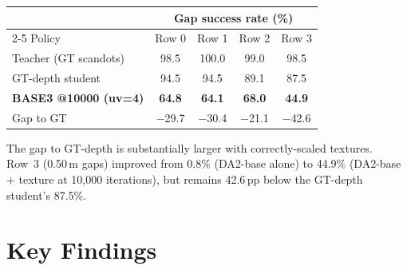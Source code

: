 \documentclass[11pt,a4paper]{article}
\newcommand{\best}[1]{\textcolor{best}{\textbf{#1}}}
\begin{document}
\begin{center}
\begin{tabular}{l cccc}
\toprule
& \multicolumn{4}{c}{Gap success rate (\%)} \\
\cmidrule(lr){2-5}
Policy & Row 0 & Row 1 & Row 2 & Row 3 \\
\midrule
Teacher (GT scandots) & 98.5 & 100.0 & 99.0 & 98.5 \\
GT-depth student     & 94.5 & 94.5 & 89.1 & 87.5 \\
\best{BASE3 @10000 (uv=4)} & \best{64.8} & \best{64.1} & \best{68.0} & \best{44.9} \\
Gap to GT            & $-$29.7 & $-$30.4 & $-$21.1 & $-$42.6 \\
\bottomrule
\end{tabular}
\end{center}

The gap to GT-depth is substantially larger with correctly-scaled textures.
Row~3 (0.50\,m gaps) improved from 0.8\% (DA2-base alone) to 44.9\% (DA2-base +
texture at 10{,}000 iterations), but remains 42.6\,pp below the GT-depth
student's 87.5\%.

\section{Key Findings}
\end{document}
